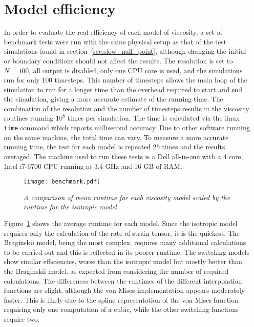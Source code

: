 \section{Model efficiency}

In order to evaluate the real efficiency of each model of viscosity, a set of benchmark tests were run with the same physical setup as that of the test simulations found in section~\ref{sec:slow_null_point}, although changing the initial or boundary conditions should not affect the results. The resolution is set to $N=100$, all output is disabled, only one CPU core is used, and the simulations run for only $100$ timesteps. This number of timesteps allows the main loop of the simulation to run for a longer time than the overhead required to start and end the simulation, giving a more accurate estimate of the running time. The combination of the resolution and the number of timesteps results in the viscosity routines running $10^{8}$ times per simulation. The time is calculated via the linux \verb|time| command which reports millisecond accuracy. Due to other software running on the same machine, the total time can vary. To measure a more accurate running time, the test for each model is repeated $25$ times and the results averaged. The machine used to run these tests is a Dell all-in-one with a 4 core, Intel i7-6700 CPU running at 3.4 GHz and 16 GB of RAM. 

\begin{figure}[t]
  \centering
  \texttt{[image: benchmark.pdf]}
  \caption{\emph{A comparison of mean runtime for each viscosity model scaled by the runtime for the isotropic model.}}%
  \label{fig:benchmark}
\end{figure}

Figure~\ref{fig:benchmark} shows the average runtime for each model. Since the isotropic model requires only the calculation of the rate of strain tensor, it is the quickest. The Braginskii model, being the most complex, requires many additional calculations to be carried out and this is reflected in its poorer runtime. The switching models show similar efficiencies, worse than the isotropic model but mostly better than the Braginskii model, as expected from considering the number of required calculations. The differences between the runtimes of the different interpolation functions are slight, although the von Mises implementation appears moderately faster. This is likely due to the spline representation of the von Mises function requiring only one computation of a cubic, while the other switching functions require two.

